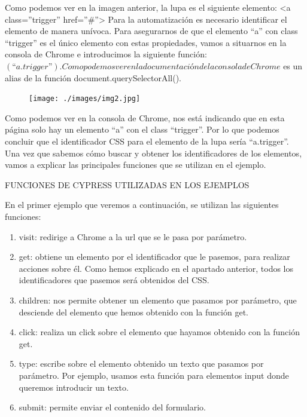 \documentclass[letterpaper, 12pt, spanish]{article}
\begin{document}
Como podemos ver en la imagen anterior, la lupa es el siguiente elemento: <a class=”trigger” href=”#”>
Para la automatización es necesario identificar el elemento de manera unívoca. Para asegurarnos de que el elemento “a” con class “trigger” es el único elemento con estas propiedades, vamos a situarnos en la consola de Chrome e introducimos la siguiente función: $(“a.trigger”).
Como podemos ver en la documentación de la consola de Chrome $ es un alias de la función document.querySelectorAll().

\begin{figure}[H]
	\begin{center}
		\texttt{[image: ./images/img2.jpg]}
		\caption{}
	\end{center}
\end{figure}

Como podemos ver en la consola de Chrome, nos está indicando que en esta página solo hay un elemento “a” con el class “trigger”. Por lo que podemos concluir que el identificador CSS para el elemento de la lupa sería “a.trigger”.
Una vez que sabemos cómo buscar y obtener los identificadores de los elementos, vamos a explicar las principales funciones que se utilizan en el ejemplo.

FUNCIONES DE CYPRESS UTILIZADAS EN LOS EJEMPLOS

En el primer ejemplo que veremos a continuación, se utilizan las siguientes funciones:

\begin{enumerate} %
	\item \textbf{}visit: redirige a Chrome a la url que se le pasa por parámetro.
	\item \textbf{}get: obtiene un elemento por el identificador que le pasemos, para realizar acciones sobre él. Como hemos explicado en el apartado anterior, todos los identificadores que pasemos será obtenidos del CSS.
	\item \textbf{}children: nos permite obtener un elemento que pasamos por parámetro, que desciende del elemento que hemos obtenido con la función get.
	\item \textbf{}click: realiza un click sobre el elemento que hayamos obtenido con la función get.
	\item \textbf{}type: escribe sobre el elemento obtenido un texto que pasamos por parámetro. Por ejemplo, usamos esta función para elementos input donde queremos introducir un texto.
	
	\item \textbf{}submit: permite enviar el contenido del formulario.
	
\end{enumerate}
\end{document}
